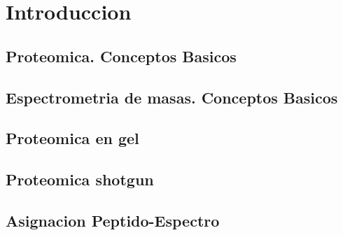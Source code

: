 %


\chapter{Introduccion}





\section{Proteomica. Conceptos Basicos}



\section{Espectrometria de masas. Conceptos Basicos}



\section{Proteomica en gel}



\section{Proteomica shotgun}



\section{Asignacion Peptido-Espectro}



